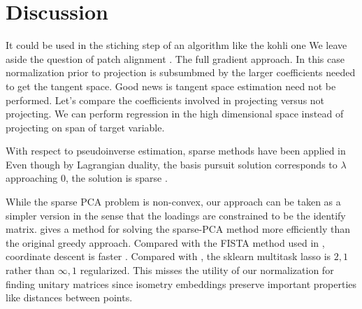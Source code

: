 \section{Discussion}
\label{sec:discussion}



It could be used in the stiching step of an algorithm like the kohli one
We leave aside the question of patch alignment \cite{https://arxiv.org/pdf/2303.11620.pdf, LDLE paper}.
The full gradient approach.
In this case normalization prior to projection is subsumbmed by the larger coefficients needed to get the tangent space.
Good news is tangent space estimation need not be performed.
Let's compare the coefficients involved in projecting versus not projecting.
We can perform regression in the high dimensional space instead of projecting on span of target variable.

With respect to pseudoinverse estimation, sparse methods have been applied in \cite{Sun2012-vp}
Even though by Lagrangian duality, the basis pursuit solution corresponds to $\lambda$ approaching $0$, the solution is sparse \cite{Tropp04-ju}.


While the sparse PCA problem is non-convex, our approach can be taken as a simpler version in the sense that the loadings are constrained to be the identify matrix.
\cite{Bertsimas2022-qo} gives a method for solving the sparse-PCA method more efficiently than the original greedy approach.
Compared with the FISTA method used in  \cite{Koelle2022-ju, Koelle2024-no}, coordinate descent \cite{Friedman-2007-yb, Meier2008-ts, Qin2013-tx} is faster \cite{Catalina2018-ek, Zhao2023-xn}.
Compared with \cite{Tropp06-sg, Liu2009-yo}, the sklearn multitask lasso is $2,1$ rather than $\infty,1$ regularized.
This misses the utility of our normalization for finding unitary matrices since isometry embeddings preserve important properties like distances between points.

